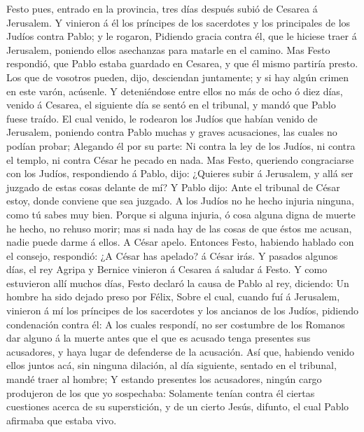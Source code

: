  Festo pues, entrado en la provincia, tres días después
subió de Cesarea á Jerusalem.  Y vinieron á él los príncipes
de los sacerdotes y los principales de los Judíos contra Pablo; y le
rogaron,  Pidiendo gracia contra él, que le hiciese traer á
Jerusalem, poniendo ellos asechanzas para matarle en el camino.
 Mas Festo respondió, que Pablo estaba guardado en Cesarea,
y que él mismo partiría presto.  Los que de vosotros pueden,
dijo, desciendan juntamente; y si hay algún crimen en este varón,
acúsenle.  Y deteniéndose entre ellos no más de ocho ó diez
días, venido á Cesarea, el siguiente día se sentó en el tribunal, y
mandó que Pablo fuese traído.  El cual venido, le rodearon
los Judíos que habían venido de Jerusalem, poniendo contra Pablo muchas
y graves acusaciones, las cuales no podían probar;  Alegando
él por su parte: Ni contra la ley de los Judíos, ni contra el templo, ni
contra César he pecado en nada.  Mas Festo, queriendo
congraciarse con los Judíos, respondiendo á Pablo, dijo: ¿Quieres subir
á Jerusalem, y allá ser juzgado de estas cosas delante de mí?
 Y Pablo dijo: Ante el tribunal de César estoy, donde
conviene que sea juzgado. A los Judíos no he hecho injuria ninguna, como
tú sabes muy bien.  Porque si alguna injuria, ó cosa alguna
digna de muerte he hecho, no rehuso morir; mas si nada hay de las cosas
de que éstos me acusan, nadie puede darme á ellos. A César apelo.
 Entonces Festo, habiendo hablado con el consejo,
respondió: ¿A César has apelado? á César irás.  Y pasados
algunos días, el rey Agripa y Bernice vinieron á Cesarea á saludar á
Festo.  Y como estuvieron allí muchos días, Festo declaró
la causa de Pablo al rey, diciendo: Un hombre ha sido dejado preso por
Félix,  Sobre el cual, cuando fuí á Jerusalem, vinieron á
mí los príncipes de los sacerdotes y los ancianos de los Judíos,
pidiendo condenación contra él:  A los cuales respondí, no
ser costumbre de los Romanos dar alguno á la muerte antes que el que es
acusado tenga presentes sus acusadores, y haya lugar de defenderse de la
acusación.  Así que, habiendo venido ellos juntos acá, sin
ninguna dilación, al día siguiente, sentado en el tribunal, mandé traer
al hombre;  Y estando presentes los acusadores, ningún
cargo produjeron de los que yo sospechaba:  Solamente
tenían contra él ciertas cuestiones acerca de su superstición, y de un
cierto Jesús, difunto, el cual Pablo afirmaba que estaba vivo.
